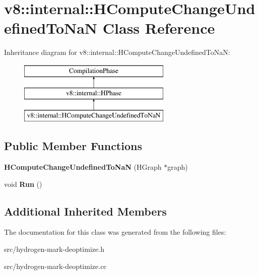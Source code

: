 \hypertarget{classv8_1_1internal_1_1_h_compute_change_undefined_to_na_n}{}\section{v8\+:\+:internal\+:\+:H\+Compute\+Change\+Undefined\+To\+Na\+N Class Reference}
\label{classv8_1_1internal_1_1_h_compute_change_undefined_to_na_n}
Inheritance diagram for v8\+:\+:internal\+:\+:H\+Compute\+Change\+Undefined\+To\+Na\+N\+:\begin{figure}[H]
\begin{center}
\leavevmode
\includegraphics[height=3.000000cm]{classv8_1_1internal_1_1_h_compute_change_undefined_to_na_n}
\end{center}
\end{figure}
\subsection*{Public Member Functions}
\begin{DoxyCompactItemize}
\item 
\hypertarget{classv8_1_1internal_1_1_h_compute_change_undefined_to_na_n_a7106bf1ec5f7e78f2be71aadbcd0203b}{}{\bfseries H\+Compute\+Change\+Undefined\+To\+Na\+N} (H\+Graph $\ast$graph)\label{classv8_1_1internal_1_1_h_compute_change_undefined_to_na_n_a7106bf1ec5f7e78f2be71aadbcd0203b}

\item 
\hypertarget{classv8_1_1internal_1_1_h_compute_change_undefined_to_na_n_a73d617bad7cdfbf02588d797abc82dbf}{}void {\bfseries Run} ()\label{classv8_1_1internal_1_1_h_compute_change_undefined_to_na_n_a73d617bad7cdfbf02588d797abc82dbf}

\end{DoxyCompactItemize}
\subsection*{Additional Inherited Members}


The documentation for this class was generated from the following files\+:\begin{DoxyCompactItemize}
\item 
src/hydrogen-\/mark-\/deoptimize.\+h\item 
src/hydrogen-\/mark-\/deoptimize.\+cc\end{DoxyCompactItemize}
